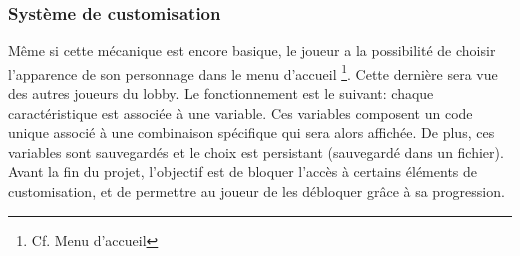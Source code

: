     \subsubsection{Système de customisation}
    Même si cette mécanique est encore basique, le joueur a la possibilité de choisir l'apparence de son personnage dans le menu d'accueil
    \footnote{Cf. Menu d'accueil}. Cette dernière sera vue des autres joueurs du lobby. Le fonctionnement est le suivant: chaque caractéristique est associée 
    à une variable. Ces variables composent un code unique associé à une combinaison spécifique qui sera alors affichée. De plus, ces variables sont 
    sauvegardés et le choix est persistant (sauvegardé dans un fichier). Avant la fin du projet, l'objectif est de bloquer l'accès à certains éléments de 
    customisation, et de permettre au joueur de les débloquer grâce à sa progression.